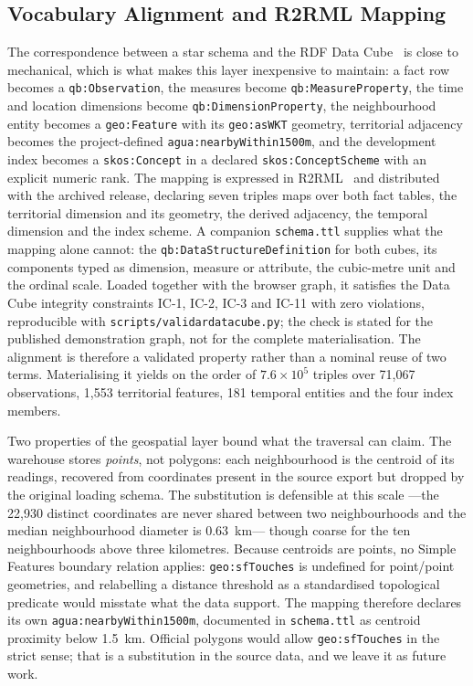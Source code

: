\documentclass[runningheads]{llncs}
\newif\ifmarcarcambios
\newcommand{\icokg}[1]{\ifmarcarcambios\textcolor{nuevo}{#1}\else#1\fi}
\newenvironment{icokgblock}{\ifmarcarcambios\color{nuevo}\fi}{}
\renewcommand{\_}{\origunderscore\allowbreak}
\begin{document}
\begin{icokgblock}
\subsection{Vocabulary Alignment and R2RML Mapping}

The correspondence between a star schema and the RDF Data Cube~\cite{datacube}
is close to mechanical, which is what makes this layer inexpensive to maintain: a
fact row becomes a \texttt{qb:Observation}, the measures become
\texttt{qb:MeasureProperty}, the time and location dimensions become
\texttt{qb:DimensionProperty}, the neighbourhood entity becomes a
\texttt{geo:Feature} with its \texttt{geo:asWKT} geometry, territorial adjacency
becomes \icokg{the project-defined \texttt{agua:nearbyWithin1500m}}, and the development index becomes a
\texttt{skos:Concept} \icokg{in a declared \texttt{skos:ConceptScheme} with an explicit numeric rank}. The mapping is expressed in R2RML~\cite{r2rml} and distributed with the archived
release, declaring seven triples maps over both fact tables, the territorial
dimension and its geometry, the derived adjacency, the temporal dimension and the
index scheme. \icokg{A companion \texttt{schema.ttl} supplies what the mapping alone
cannot: the \texttt{qb:DataStructureDefinition} for both cubes, its components
typed as dimension, measure or attribute, the cubic-metre unit and the ordinal
scale. Loaded together with the browser
graph, it satisfies the Data Cube integrity constraints IC-1, IC-2, IC-3 and
IC-11 with zero violations, reproducible with \texttt{scripts/validar\_datacube.py};
the check is stated for the published demonstration graph, not for the complete
materialisation. The alignment is therefore a validated property rather than a
nominal reuse of two terms.}
Materialising it yields \icokg{on the order of $7.6\times10^{5}$ triples} over
71{,}067 observations, 1{,}553 territorial features, 181 temporal entities and
the four index members.


Two properties of the geospatial layer bound what the traversal can claim. The
warehouse stores \emph{points}, not polygons: each neighbourhood is the centroid
of its readings, recovered from coordinates present in the source export but
dropped by the original loading schema. The substitution is defensible at
this scale ---the 22,930 distinct coordinates are never shared between two
neighbourhoods and the median neighbourhood diameter is 0.63~km--- though coarse
for the ten neighbourhoods above three kilometres. \icokg{Because centroids are points, no Simple Features boundary relation applies:
\texttt{geo:sfTouches} is undefined for point/point geometries, and relabelling a
distance threshold as a standardised topological predicate would misstate what
the data support. The mapping therefore declares its own
\texttt{agua:nearbyWithin1500m}, documented in \texttt{schema.ttl} as centroid
proximity below 1.5~km. Official polygons would allow \texttt{geo:sfTouches} in
the strict sense; that is a substitution in the source data, and we leave it as
future work.}


\end{icokgblock}
\end{document}
